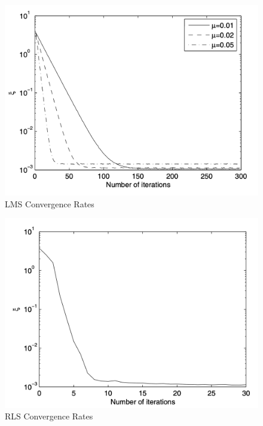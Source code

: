 \begin{figure}[h!]
    \centering
    \includegraphics[scale=0.7]{figures/lms-convergence.png}
    \caption{LMS Convergence Rates}
    \label{fig:lms-conv}
\end{figure}
\begin{figure}[h!]
    \centering
    \includegraphics[scale=0.7]{figures/rls-convergence.png}
    \caption{RLS Convergence Rates}
    \label{fig:rls-conv}
\end{figure}